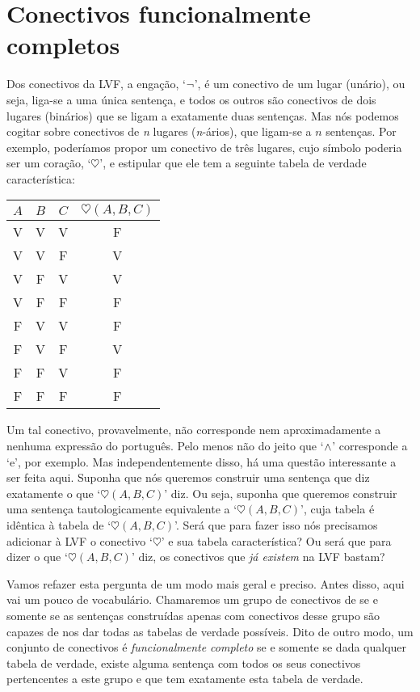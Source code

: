 \chapter{Conectivos funcionalmente completos}
        

Dos conectivos da LVF, a engação, `$\neg$', é um conectivo de um lugar (unário), ou seja, liga-se a uma única sentença, e todos os outros são conectivos de dois lugares (binários) que se ligam a exatamente duas sentenças.
Mas nós podemos cogitar sobre conectivos de \textit{n} lugares (\textit{n}-ários), que ligam-se a $n$ sentenças.
Por exemplo, poderíamos propor um conectivo de três lugares, cujo símbolo poderia ser um coração, `$\heartsuit$', e estipular que ele tem a seguinte tabela de verdade característica:
\begin{center}
\begin{tabular}{c c c | c}
$A$ & $B$ & $C$ & $\heartsuit(A,B,C)$\\
\hline
 V & V & V & F \\
 V & V & F & V \\
 V & F & V & V \\
 V & F & F & F \\
 F & V & V & F \\
 F & V & F & V \\
 F & F & V & F \\
 F & F & F & F
\end{tabular}
\end{center}
Um tal conectivo, provavelmente, não corresponde nem aproximadamente a nenhuma expressão do português. Pelo menos não do jeito que `$\wedge$' corresponde a `e', por exemplo.
Mas independentemente disso, há uma questão interessante a ser feita aqui. Suponha que nós queremos construir uma sentença que diz exatamente o que `$\heartsuit(A,B,C)$' diz.
Ou seja, suponha que queremos construir uma sentença tautologicamente equivalente a `$\heartsuit(A,B,C)$', cuja tabela é idêntica à tabela de `$\heartsuit(A,B,C)$'.
Será que para fazer isso nós precisamos adicionar à LVF o conectivo  `$\heartsuit$' e sua tabela característica?
Ou será que para dizer o que `$\heartsuit(A,B,C)$' diz, os conectivos que \emph{já existem} na LVF bastam?

Vamos refazer esta pergunta de um modo mais geral e preciso.
Antes disso, aqui vai um pouco de vocabulário.
Chamaremos um grupo de conectivos de  se e somente se as sentenças construídas apenas com conectivos desse grupo são capazes de nos dar todas as tabelas de verdade possíveis.
Dito de outro modo, um conjunto de conectivos é \emph{funcionalmente completo} se e somente se dada qualquer tabela de verdade, existe alguma sentença com todos os seus conectivos pertencentes a este grupo e que tem exatamente esta tabela de verdade.

